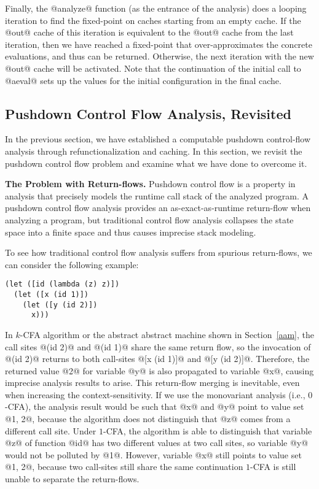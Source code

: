 \documentclass[acmsmall]{acmart}\settopmatter{}
\begin{document}
Finally, the @analyze@ function (as the entrance of the analysis) does a looping iteration
to find the fixed-point on caches starting from an empty cache.
If the @out@ cache of this iteration is equivalent to the @out@ cache from the last iteration,
then we have reached a fixed-point that over-approximates the concrete evaluations,
and thus can be returned.
Otherwise, the next iteration with the new @out@ cache will be activated.
Note that the continuation of the initial call to @aeval@ sets up the values for the
initial configuration in the final cache.

\subsection{Pushdown Control Flow Analysis, Revisited} \label{pdcfarevisit}

In the previous section, we have established a computable pushdown control-flow
analysis through refunctionalization and caching. In this section,
we revisit the pushdown control flow problem and examine what we have done to
overcome it.

\textbf{The Problem with Return-flows.}
Pushdown control flow is a property in analysis that precisely models
the runtime call stack of the analyzed program.
A pushdown control flow analysis provides an as-exact-as-runtime return-flow
when analyzing a program, but traditional control flow analysis collapses
the state space into a finite space and thus causes imprecise stack modeling.

To see how traditional control flow analysis suffers from spurious return-flows,
we can consider the following example:

\begin{lstlisting}
(let ([id (lambda (z) z)])
  (let ([x (id 1)])
    (let ([y (id 2)])
      x)))
\end{lstlisting}

In $k$-CFA algorithm or the abstract abstract machine shown in Section~\ref{aam},
the call sites @(id 2)@ and @(id 1)@ share the same return flow,
so the invocation of @(id 2)@ returns to both call-sites @[x (id 1)]@ and @[y (id 2)]@.
Therefore, the returned value @2@ for variable @y@ is also propagated to
variable @x@, causing imprecise analysis results to arise.
This return-flow merging is inevitable, even when increasing the context-sensitivity.
If we use the monovariant analysis (i.e., $0$-CFA), the analysis result would be such that @x@ and @y@ point to value set @{1, 2}@, because the algorithm does not distinguish that
@z@ comes from a different call site.
Under $1$-CFA, the algorithm is able to distinguish that variable @z@ of function
@id@ has two different values at two call sites, so variable @y@
would not be polluted by @1@.
However, variable @x@ still points to value set @{1, 2}@, because two call-sites still share the same continuation $1$-CFA is still unable to separate the return-flows.
\end{document}
